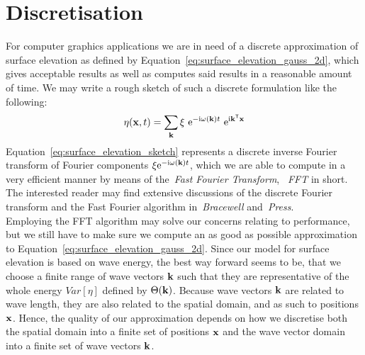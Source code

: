 \section{Discretisation}
For computer graphics applications we are in need of a discrete approximation 
of surface elevation as defined by 
Equation~\ref{eq:surface_elevation_gauss_2d}, 
which gives acceptable results as well as computes said results in a reasonable 
amount of time. We may write a rough sketch of such a discrete formulation like 
the following:
\begin{equation}
\label{eq:surface_elevation_sketch}
 \eta(\mathbf{x}, t) = \sum_{\mathbf{k}} 
\xi~\mathrm{e}^{-\mathrm{i}\omega(\mathbf{k}) t}
~\mathrm{e}^{\mathrm{i}\mathbf{k}^{\mathsf{T}}\mathbf{x}}
\end{equation}
Equation~\ref{eq:surface_elevation_sketch} represents a discrete inverse 
Fourier transform of Fourier components 
$\xi\mathrm{e}^{-\mathrm{i}\omega(\mathbf{k}) t}$, which we are able to compute in 
a very efficient manner by means of the~\emph{Fast Fourier Transform}, 
~\emph{FFT} in short. The interested reader may find extensive discussions of 
the discrete Fourier transform and the Fast Fourier algorithm
in~\emph{Bracewell}\cite{book:bracewell2000fourier} 
and~\emph{Press}\cite{book:numericalrecipes}.\\

Employing the FFT algorithm may solve our concerns relating to performance, but 
we still have to make sure we compute an as good as possible approximation to 
Equation~\ref{eq:surface_elevation_gauss_2d}. Since our model for surface 
elevation is based on wave energy, the best way forward seems to be, that we 
choose a finite range of wave vectors $\mathbf{k}$ such that they are 
representative of the whole energy $Var[\eta]$ defined by $\Theta(\mathbf{k})$. 
Because wave vectors $\mathbf{k}$ are related to wave length, they are also 
related to the spatial domain, and as such to positions $\mathbf{x}$. Hence, the 
quality of our approximation depends on how we discretise both the spatial 
domain into a finite set of positions $\mathbf{x}$ and the wave vector domain 
into a finite set of wave vectors $\mathbf{k}$.
%
